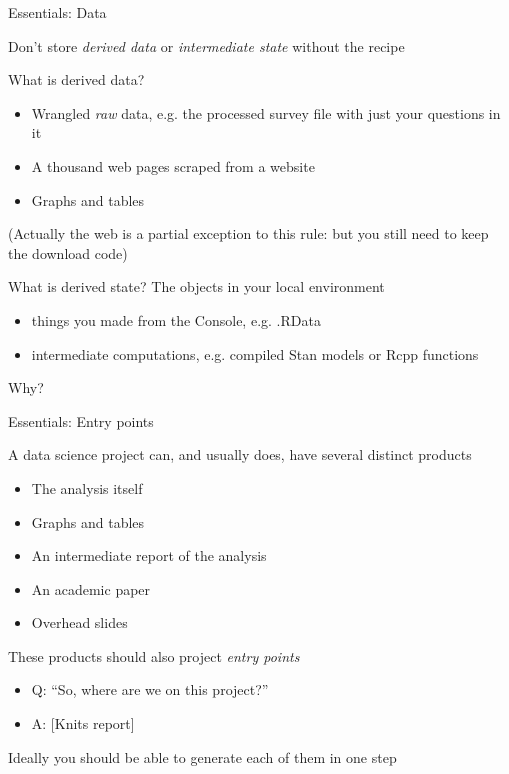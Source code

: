 \documentclass{hertieteaching}
\begin{document}
\begin{frame}{Essentials: Data}

Don't store \textit{derived data} or \textit{intermediate state} without the recipe

\pause

What is derived data?
\begin{itemize}
  \item Wrangled \textit{raw} data, e.g. the processed survey file with just your questions in it
  \item A thousand web pages scraped from a website
  \item Graphs and tables
\end{itemize}
(Actually the web is a partial exception to this rule: but you still need to keep the download code)

What is derived state? The objects in your local environment
\begin{itemize}
  \item things you made from the Console, e.g. \textsf{.RData}
  \item intermediate computations, e.g. compiled \textsf{Stan} models or \textsf{Rcpp} functions
\end{itemize}

Why?

\end{frame}
\begin{frame}{Essentials: Entry points}

A data science project can, and usually does, have several distinct products
\begin{itemize}
  \item The analysis itself
  \item Graphs and tables
  \item An intermediate report of the analysis
  \item An academic paper
  \item Overhead slides
\end{itemize}

These products should also project \textit{entry points} 
\begin{itemize}
  \item Q: ``So, where are we on this project?''
  \item A: [Knits report]
\end{itemize}

Ideally you should be able to generate each of them in one step


\end{frame}
\end{document}
